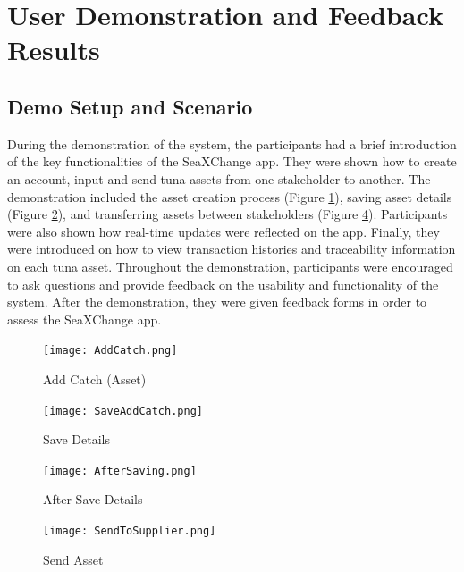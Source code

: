 \section{User Demonstration and Feedback Results}
\subsection{Demo Setup and Scenario}
During the demonstration of the system, the participants had a brief introduction of the key functionalities of the SeaXChange app. They were shown how to create an account, input and send tuna assets from one stakeholder to another. The demonstration included the asset creation process (Figure \ref{fig:add_catch}), saving asset details (Figure \ref{fig:save_details}), and transferring assets between stakeholders (Figure \ref{fig:sendto_supplier}). Participants were also shown how real-time updates were reflected on the app. Finally, they were introduced on how to view transaction histories and traceability information on each tuna asset. Throughout the demonstration, participants were encouraged to ask questions and provide feedback on the usability and functionality of the system. After the demonstration, they were given feedback forms in order to assess the SeaXChange app. 

\begin{figure}[H]
	\centering
	\texttt{[image: AddCatch.png]}
	\caption{Add Catch (Asset)}
	\label{fig:add_catch}
\end{figure}

\begin{figure}[H]
	\centering
	\texttt{[image: SaveAddCatch.png]}
	\caption{Save Details}
	\label{fig:save_details}
\end{figure}

\begin{figure}[H]
	\centering
	\texttt{[image: AfterSaving.png]}
	\caption{After Save Details}
	\label{fig:after_save}
\end{figure}

\begin{figure}[H]
	\centering
	\texttt{[image: SendToSupplier.png]}
	\caption{Send Asset}
	\label{fig:sendto_supplier}
\end{figure}


